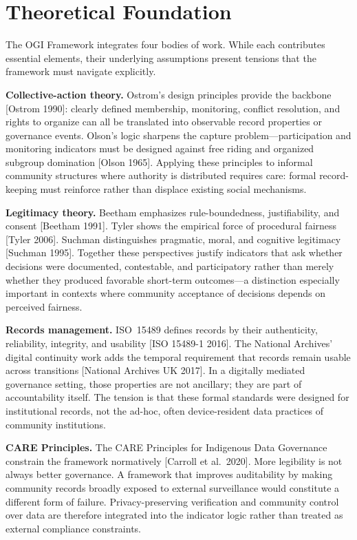 \documentclass[sigconf,anonymous]{acmart}
\begin{document}
\section{Theoretical Foundation}

The OGI Framework integrates four bodies of work. While each contributes essential elements, their underlying assumptions present tensions that the framework must navigate explicitly.

\textbf{Collective-action theory.} Ostrom's design principles provide the backbone [Ostrom 1990]: clearly defined membership, monitoring, conflict resolution, and rights to organize can all be translated into observable record properties or governance events. Olson's logic sharpens the capture problem---participation and monitoring indicators must be designed against free riding and organized subgroup domination [Olson 1965]. Applying these principles to informal community structures where authority is distributed requires care: formal record-keeping must reinforce rather than displace existing social mechanisms.

\textbf{Legitimacy theory.} Beetham emphasizes rule-boundedness, justifiability, and consent [Beetham 1991]. Tyler shows the empirical force of procedural fairness [Tyler 2006]. Suchman distinguishes pragmatic, moral, and cognitive legitimacy [Suchman 1995]. Together these perspectives justify indicators that ask whether decisions were documented, contestable, and participatory rather than merely whether they produced favorable short-term outcomes---a distinction especially important in contexts where community acceptance of decisions depends on perceived fairness.

\textbf{Records management.} ISO~15489 defines records by their authenticity, reliability, integrity, and usability [ISO 15489-1 2016]. The National Archives' digital continuity work adds the temporal requirement that records remain usable across transitions [National Archives UK 2017]. In a digitally mediated governance setting, those properties are not ancillary; they are part of accountability itself. The tension is that these formal standards were designed for institutional records, not the ad-hoc, often device-resident data practices of community institutions.

\textbf{CARE Principles.} The CARE Principles for Indigenous Data Governance constrain the framework normatively [Carroll et al.\ 2020]. More legibility is not always better governance. A framework that improves auditability by making community records broadly exposed to external surveillance would constitute a different form of failure. Privacy-preserving verification and community control over data are therefore integrated into the indicator logic rather than treated as external compliance constraints.
\end{document}
